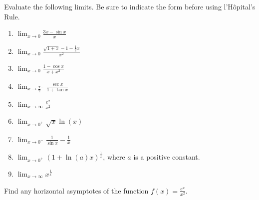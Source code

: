 \documentclass{ximera}
\begin{document}
\begin{exercise}
Evaluate the following limits.  Be sure to indicate the form before using l'H\^opital's Rule.

\begin{enumerate}
    \item $\displaystyle \lim_{x\rightarrow 0} \frac{3x-\sin x}{x}$\\
   
    \item $\displaystyle \lim_{x\rightarrow 0}\frac{\sqrt{1+x}-1-\frac{1}{2}x}{x^2}$\\

    \item $\displaystyle \lim_{x\rightarrow 0}\frac{1-\cos x}{x+x^2}$\\

    \item $\displaystyle \lim_{x\rightarrow \frac{\pi}{2}^-}\frac{\sec x}{1+\tan x}$\\

    \item $\displaystyle \lim_{x\rightarrow \infty} \frac{e^x}{x^2}$\\

    \item  $\displaystyle \lim_{x\rightarrow 0^+} \sqrt{x}\ln(x)$\\

    \item $\displaystyle \lim_{x\rightarrow 0^-} \frac{1}{\sin x}-\frac{1}{x}$\\

    \item $\displaystyle \lim_{x\rightarrow 0^+} (1+\ln(a)x)^{\frac{1}{x}}$, where $a$ is a positive constant.\\

    \item $\displaystyle \lim_{x\rightarrow \infty} x^{\frac{1}{x}}$\\

\end{enumerate}
\end{exercise}

    
\begin{exercise}    
    Find any horizontal asymptotes of the function $f(x)=\frac{e^x}{x^2}$. 
\end{exercise}
\end{document}

